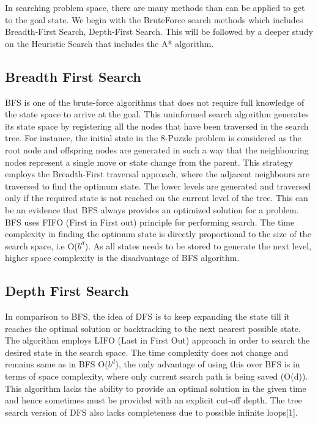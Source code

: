 \documentclass{svproc}
\begin{document}
\noindent In searching problem space, there are many methods than can be applied to get to the goal state. We begin with the BruteForce search methods which includes Breadth-First Search, Depth-First Search. This will be followed by a deeper study on the Heuristic Search that includes the A* algorithm.

\subsection{Breadth First Search}
\noindent BFS is one of the brute-force algorithms that does not require full knowledge of the state space to arrive at the goal. This uninformed search algorithm generates its state space by registering all the nodes that have been traversed in the search tree. For instance, the initial state in the 8-Puzzle problem is considered as the root node and offspring nodes are generated in such a way that the neighbouring nodes represent a single move or state change from the parent. This strategy employs the Breadth-First traversal approach, where the adjacent neighbours are traversed to find the optimum state. The lower levels are generated and traversed only if the required state is not reached on the current level of the tree. This can be an evidence that BFS always provides an optimized solution for a problem. BFS uses FIFO (First in First out) principle for performing search. The time complexity in finding the optimum state is directly proportional to the size of the search space, i.e O($b^{d}$). As all states needs to be stored to generate the next level, higher space complexity is the disadvantage of BFS algorithm.

\subsection{Depth First Search}
\noindent In comparison to BFS, the idea of DFS is to keep expanding the state till it reaches the optimal solution or backtracking to the next nearest possible state. The algorithm employs LIFO (Last in First Out) approach in order to search the desired state in the search space. The time complexity does not change and remains same as in BFS O($b^{d}$), the only advantage of using this over BFS is in terms of space complexity, where only current search path is being saved (O(d)). This algorithm lacks the ability to provide an optimal solution in the given time and hence sometimes must be provided with an explicit cut-off depth.  The tree search version of DFS also lacks completeness due to possible infinite loops[1].
\end{document}
